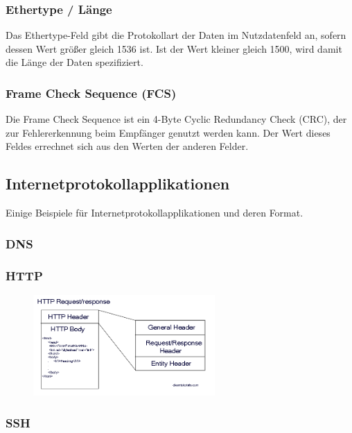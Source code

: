 \documentclass[11pt, a4paper]{article}
\begin{document}
\subsubsection{Ethertype / Länge}
Das Ethertype-Feld gibt die Protokollart der Daten im Nutzdatenfeld an, sofern dessen Wert größer gleich 1536 ist. Ist der Wert kleiner gleich 1500, wird damit die Länge der Daten spezifiziert.

\subsubsection{Frame Check Sequence (FCS)}
Die Frame Check Sequence ist ein 4-Byte Cyclic Redundancy Check (CRC), der zur Fehlererkennung beim Empfänger genutzt werden kann. Der Wert dieses Feldes errechnet sich aus den Werten der anderen Felder.


\subsection{Internetprotokollapplikationen}
Einige Beispiele für Internetprotokollapplikationen und deren Format.

\subsubsection{DNS}

\begin{figure}[H]
\centering
{}
\end{figure}

\subsubsection{HTTP}

\begin{figure}[H]
\centering
\includegraphics[width=0.618\textwidth]{graphics/http}
\end{figure}

\subsubsection{SSH}
\begin{figure}[H]
\centering
{}
\end{figure}
\end{document}
